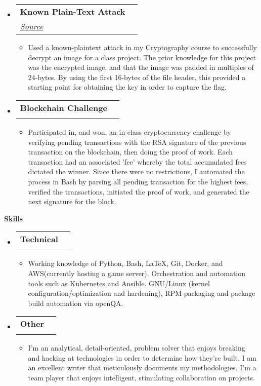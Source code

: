 \documentclass[letterpaper, 10pt]{article}
\makeatletter
\newcommand{\resitem}[1]{\item #1 \vspace{-2pt}}
\newcommand{\resheading}[1]{{\large \colorbox{mywhite}{\begin{minipage}{\dimexpr\textwidth-2\fboxsep}
    {\textbf{#1 \vphantom{p\^{E}}}}\end{minipage}}}}
\newcommand{\ressubheading}[4]{
    \begin{tabular*}{\linewidth}{l@{\extracolsep{\fill}}r}
        \textbf{#1} & #2 \\
        \textit{#3} & \textit{#4} \\
    \end{tabular*}\vspace{-6pt}
}
\makeatother
\begin{document}
\begin{itemize}
\item
    \ressubheading{Known Plain-Text Attack}{}{\href{http://github.com/deadmoose14/enc}{Source}}{}
    \begin{itemize}
        \resitem{
        Used a known-plaintext attack in my Cryptography course to successfully decrypt an image for a class project. The prior knowledge for this project was the encrypted image, and that the image was padded in multiples of 24-bytes. By using the first 16-bytes of the file header, this provided a starting point for obtaining the key in order to capture the flag.}
    \end{itemize}
\item
    \ressubheading{Blockchain Challenge}{}{}{}
        \begin{itemize}
            \resitem{
            Participated in, and won, an in-class cryptocurrency challenge by verifying pending transactions with the RSA signature of the previous transaction on the blockchain, then doing the proof of work. Each transaction had an associated 'fee' whereby the total accumulated fees dictated the winner. Since there were no restrictions, I automated the process in Bash by parsing all pending transaction for the highest fees, verified the transactions, initiated the proof of work, and generated the next signature for the block.}
        \end{itemize}
\end{itemize}
\resheading{Skills}
\begin{itemize}
    \item 
        \ressubheading{Technical}{}{}{}
        \begin{itemize}
            \resitem{Working knowledge of Python, Bash, \LaTeX, Git, Docker, and AWS(currently hosting a game server). Orchestration and automation tools such as Kubernetes and Ansible. GNU/Linux (kernel configuration/optimization and hardening), RPM packaging and package build automation via openQA.}
        \end{itemize}
    \item
        \ressubheading{Other}{}{}{}
        \begin{itemize}
            \resitem{I'm an analytical, detail-oriented, problem solver that enjoys breaking and hacking at technologies in order to determine how they're built. I am an excellent writer that meticulously documents my methodologies. I'm a team player that enjoys intelligent, stimulating collaboration on projects.}
        \end{itemize}
\end{itemize}
\end{document}
